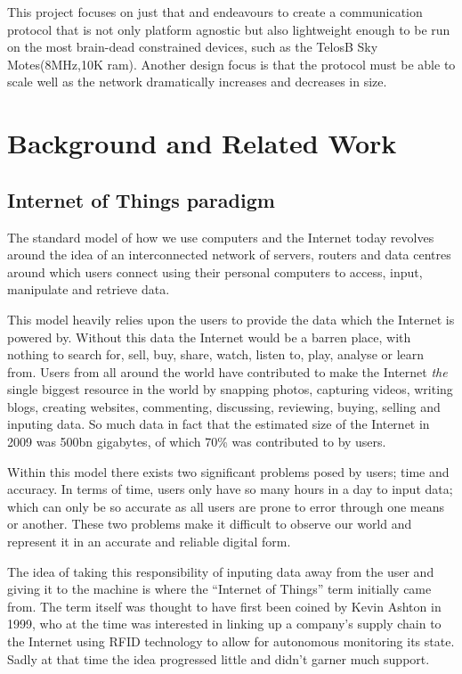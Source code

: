 \documentclass{l4proj}
\begin{document}
This project focuses on just that and endeavours to create a communication protocol that is not only platform agnostic but also lightweight enough to be run on the most brain-dead constrained devices, such as the TelosB Sky Motes(8MHz,10K ram)\cite{TelosB}. Another design focus is that the protocol must be able to scale well as the network dramatically increases and decreases in size.


\chapter{Background and Related Work} %
\label{cha:background}

\section{Internet of Things paradigm} %
\label{sec:internet_of_things_paradigm}


The standard model of how we use computers and the Internet today revolves around the idea of an interconnected network of servers, routers and data centres around which users connect using their personal computers to access, input, manipulate and retrieve data. 

This model heavily relies upon the users to provide the data which the Internet is powered by. Without this data the Internet would be a barren place, with nothing to search for, sell, buy, share, watch, listen to, play, analyse or learn from.
Users from all around the world have contributed to make the Internet \textit{the} single biggest resource in the world by snapping photos, capturing videos, writing blogs, creating websites, commenting, discussing, reviewing, buying, selling and inputing data. So much data in fact that the estimated size of the Internet in 2009 was 500bn gigabytes, of which 70\% was contributed to by users.\cite{Size}   

Within this model there exists two significant problems posed by users; time and accuracy. In terms of time, users only have so many hours in a day to input data; which can only be so accurate as all users are prone to error through one means or another.
These two problems make it difficult to observe our world and represent it in an accurate and reliable digital form.

The idea of taking this responsibility of inputing data away from the user and giving it to the machine is where the ``Internet of Things'' term initially came from. The term itself was thought to have first been coined by Kevin Ashton\cite{K.Ashton} in 1999, who at the time was interested in linking up a company's supply chain to the Internet using RFID technology to allow for autonomous monitoring its state.
Sadly at that time the idea progressed little and didn't garner much support.
\end{document}
